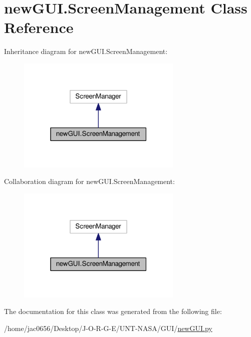 \hypertarget{classnewGUI_1_1ScreenManagement}{}\section{new\+G\+U\+I.\+Screen\+Management Class Reference}
\label{classnewGUI_1_1ScreenManagement}


Inheritance diagram for new\+G\+U\+I.\+Screen\+Management\+:\nopagebreak
\begin{figure}[H]
\begin{center}
\leavevmode
\includegraphics[width=223pt]{classnewGUI_1_1ScreenManagement__inherit__graph}
\end{center}
\end{figure}


Collaboration diagram for new\+G\+U\+I.\+Screen\+Management\+:\nopagebreak
\begin{figure}[H]
\begin{center}
\leavevmode
\includegraphics[width=223pt]{classnewGUI_1_1ScreenManagement__coll__graph}
\end{center}
\end{figure}


The documentation for this class was generated from the following file\+:\begin{DoxyCompactItemize}
\item 
/home/jac0656/\+Desktop/\+J-\/\+O-\/\+R-\/\+G-\/\+E/\+U\+N\+T-\/\+N\+A\+S\+A/\+G\+U\+I/\hyperlink{newGUI_8py}{new\+G\+U\+I.\+py}\end{DoxyCompactItemize}
